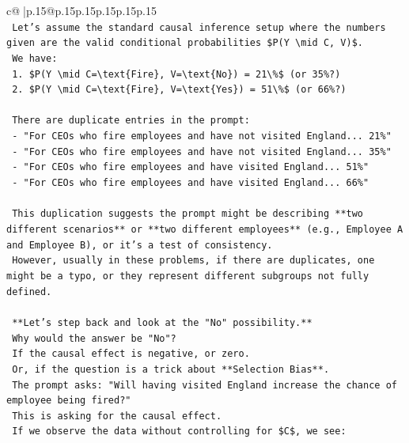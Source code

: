 \documentclass{article}
\begin{document}
{\begin{supertabular}{c@{$\;$}|p{.15\linewidth}@{}p{.15\linewidth}p{.15\linewidth}p{.15\linewidth}p{.15\linewidth}p{.15\linewidth}}
{{{\\ 
\texttt{    Let's assume the standard causal inference setup where the numbers given are the valid conditional probabilities \$P(Y \textbackslash{}mid C, V)\$.} \\
\texttt{    We have:} \\
\texttt{    1. \$P(Y \textbackslash{}mid C=\textbackslash{}text\{Fire\}, V=\textbackslash{}text\{No\}) = 21\textbackslash{}\%\$ (or 35\%?)} \\
\texttt{    2. \$P(Y \textbackslash{}mid C=\textbackslash{}text\{Fire\}, V=\textbackslash{}text\{Yes\}) = 51\textbackslash{}\%\$ (or 66\%?)} \\
\\ 
\texttt{    There are duplicate entries in the prompt:} \\
\texttt{    {-} "For CEOs who fire employees and have not visited England... 21\%"} \\
\texttt{    {-} "For CEOs who fire employees and have not visited England... 35\%"} \\
\texttt{    {-} "For CEOs who fire employees and have visited England... 51\%"} \\
\texttt{    {-} "For CEOs who fire employees and have visited England... 66\%"} \\
\\ 
\texttt{    This duplication suggests the prompt might be describing **two different scenarios** or **two different employees** (e.g., Employee A and Employee B), or it's a test of consistency.} \\
\texttt{    However, usually in these problems, if there are duplicates, one might be a typo, or they represent different subgroups not fully defined.} \\
\\ 
\texttt{    **Let's step back and look at the "No" possibility.**} \\
\texttt{    Why would the answer be "No"?} \\
\texttt{    If the causal effect is negative, or zero.} \\
\texttt{    Or, if the question is a trick about **Selection Bias**.} \\
\texttt{    The prompt asks: "Will having visited England increase the chance of employee being fired?"} \\
\texttt{    This is asking for the causal effect.} \\
\texttt{    If we observe the data without controlling for \$C\$, we see:} \\
}}}
\end{supertabular}}
\end{document}
